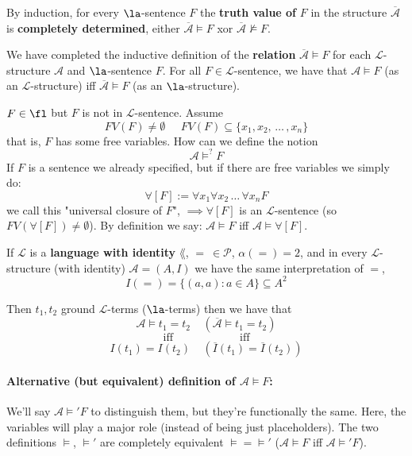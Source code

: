 \noindent
By induction, for every $\la$-sentence $F$ the \textbf{truth value of} $F$ in the structure $\overline{\mathcal{A}}$ is \textbf{completely determined}, either $\overline{\mathcal{A}} \models F$ xor $\overline{\mathcal{A}} \not \models F$.

We have completed the inductive definition of the \textbf{relation} $\overline{\mathcal{A}} \models F$ for each $\mathcal{L}$-structure $\mathcal{A}$ and $\la$-sentence $F$. For all $F \in \mathcal{L}$-sentence, we have that $\mathcal{A} \models F$ (as an $\mathcal{L}$-structure) iff $\overline{\mathcal{A}} \models F$ (as an $\la$-structure). 

\begin{remark}
	$F \in \fl$ but $F$ is not in $\mathcal{L}$-sentence. Assume
	$$ FV(F) \neq \emptyset \;\;\;\;\; FV(F) \subseteq \{x_1, x_2, \, \dots \, , x_n\} $$
	that is, $F$ has some free variables. How can we define the notion
	$$ \mathcal{A} \models^? F $$
	If $F$ is a sentence we already specified, but if there are free variables we simply do:
	$$ \forall [F] := \forall x_1 \forall x_2 \, \dots \, \forall x_n F$$
	we call this "universal closure of $F$", $\implies \forall [F]$ is an $\mathcal{L}$-sentence (so $FV(\forall[F]) \neq \emptyset$).
	By definition we say: $\mathcal A \models F$ iff $\mathcal A \models \forall [F]$.
\end{remark}

\begin{remark}
	If $\mathcal{L}$ is a \textbf{language with identity} $\lang$, $= \ \in \mathcal{P}$, $\alpha(=) = 2$, and in every $\mathcal{L}$-structure (with identity) $\mathcal{A} = (A,I)$ we have the same interpretation of $=$,
	$$ I(=) = \{(a,a): a \in A\} \subseteq A^2 $$

	\noindent
	Then $t_1, t_2$ ground $\mathcal{L}$-terms ($\la$-terms) then we have that
	$$ \mathcal{A} \models t_1 = t_2 \;\;\;\; (\overline{\mathcal{A}} \models t_1 = t_2) $$
	$$\text{iff} \quad\quad\quad\quad\quad\quad \text{iff}$$
	$$ I(t_1) = I(t_2) \;\;\;\; (\overline I (t_1) = \overline I (t_2)) $$
\end{remark}


\paragraph{Alternative (but equivalent) definition of $\mathcal{A} \models F$:} We'll say $\mathcal{A} \models' F$ to distinguish them, but they're functionally the same. Here, the variables will play a major role (instead of being just placeholders). The two definitions $\models$, $\models'$ are completely equivalent $\models = \models'$ ($\mathcal{A} \models F$ iff $\mathcal{A} \models' F$).

